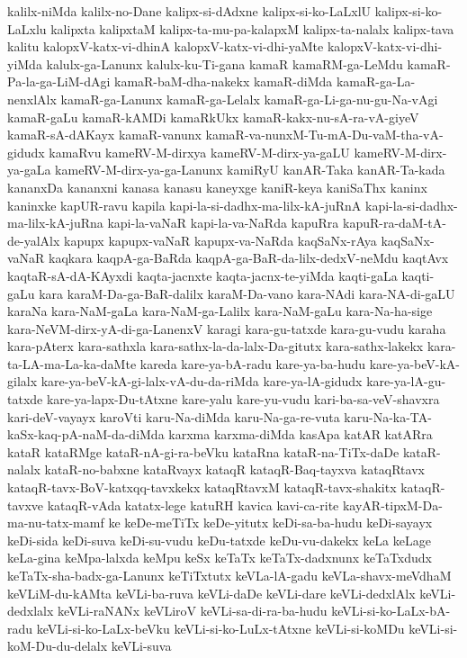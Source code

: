 {kalilx-niMda
kalilx-no-Dane
kalipx-si-dAdxne
kalipx-si-ko-LaLxlU
kalipx-si-ko-LaLxlu
kalipxta
kalipxtaM
kalipx-ta-mu-pa-kalapxM
kalipx-ta-nalalx
kalipx-tava
kalitu
kalopxV-katx-vi-dhinA
kalopxV-katx-vi-dhi-yaMte
kalopxV-katx-vi-dhi-yiMda
kalulx-ga-Lanunx
kalulx-ku-Ti-gana
kamaR
kamaRM-ga-LeMdu
kamaR-Pa-la-ga-LiM-dAgi
kamaR-baM-dha-nakekx
kamaR-diMda
kamaR-ga-La-nenxlAlx
kamaR-ga-Lanunx
kamaR-ga-Lelalx
kamaR-ga-Li-ga-nu-gu-Na-vAgi
kamaR-gaLu
kamaR-kAMDi
kamaRkUkx
kamaR-kakx-nu-sA-ra-vA-giyeV
kamaR-sA-dAKayx
kamaR-vanunx
kamaR-va-nunxM-Tu-mA-Du-vaM-tha-vA-gidudx
kamaRvu
kameRV-M-dirxya
kameRV-M-dirx-ya-gaLU
kameRV-M-dirx-ya-gaLa
kameRV-M-dirx-ya-ga-Lanunx
kamiRyU
kanAR-Taka
kanAR-Ta-kada
kananxDa
kananxni
kanasa
kanasu
kaneyxge
kaniR-keya
kaniSaThx
kaninx
kaninxke
kapUR-ravu
kapila
kapi-la-si-dadhx-ma-lilx-kA-juRnA
kapi-la-si-dadhx-ma-lilx-kA-juRna
kapi-la-vaNaR
kapi-la-va-NaRda
kapuRra
kapuR-ra-daM-tA-de-yalAlx
kapupx
kapupx-vaNaR
kapupx-va-NaRda
kaqSaNx-rAya
kaqSaNx-vaNaR
kaqkara
kaqpA-ga-BaRda
kaqpA-ga-BaR-da-lilx-dedxV-neMdu
kaqtAvx
kaqtaR-sA-dA-KAyxdi
kaqta-jacnxte
kaqta-jacnx-te-yiMda
kaqti-gaLa
kaqti-gaLu
kara
karaM-Da-ga-BaR-dalilx
karaM-Da-vano
kara-NAdi
kara-NA-di-gaLU
karaNa
kara-NaM-gaLa
kara-NaM-ga-Lalilx
kara-NaM-gaLu
kara-Na-ha-sige
kara-NeVM-dirx-yA-di-ga-LanenxV
karagi
kara-gu-tatxde
kara-gu-vudu
karaha
kara-pAterx
kara-sathxla
kara-sathx-la-da-lalx-Da-gitutx
kara-sathx-lakekx
kara-ta-LA-ma-La-ka-daMte
kareda
kare-ya-bA-radu
kare-ya-ba-hudu
kare-ya-beV-kA-gilalx
kare-ya-beV-kA-gi-lalx-vA-du-da-riMda
kare-ya-lA-gidudx
kare-ya-lA-gu-tatxde
kare-ya-lapx-Du-tAtxne
kare-yalu
kare-yu-vudu
kari-ba-sa-veV-shavxra
kari-deV-vayayx
karoVti
karu-Na-diMda
karu-Na-ga-re-vuta
karu-Na-ka-TA-kaSx-kaq-pA-naM-da-diMda
karxma
karxma-diMda
kasApa
katAR
katARra
kataR
kataRMge
kataR-nA-gi-ra-beVku
kataRna
kataR-na-TiTx-daDe
kataR-nalalx
kataR-no-babxne
kataRvayx
kataqR
kataqR-Baq-tayxva
kataqRtavx
kataqR-tavx-BoV-katxqq-tavxkekx
kataqRtavxM
kataqR-tavx-shakitx
kataqR-tavxve
kataqR-vAda
katatx-lege
katuRH
kavica
kavi-ca-rite
kayAR-tipxM-Da-ma-nu-tatx-mamf
ke
keDe-meTiTx
keDe-yitutx
keDi-sa-ba-hudu
keDi-sayayx
keDi-sida
keDi-suva
keDi-su-vudu
keDu-tatxde
keDu-vu-dakekx
keLa
keLage
keLa-gina
keMpa-lalxda
keMpu
keSx
keTaTx
keTaTx-dadxnunx
keTaTxdudx
keTaTx-sha-badx-ga-Lanunx
keTiTxtutx
keVLa-lA-gadu
keVLa-shavx-meVdhaM
keVLiM-du-kAMta
keVLi-ba-ruva
keVLi-daDe
keVLi-dare
keVLi-dedxlAlx
keVLi-dedxlalx
keVLi-raNANx
keVLiroV
keVLi-sa-di-ra-ba-hudu
keVLi-si-ko-LaLx-bA-radu
keVLi-si-ko-LaLx-beVku
keVLi-si-ko-LuLx-tAtxne
keVLi-si-koMDu
keVLi-si-koM-Du-du-delalx
keVLi-suva
}
